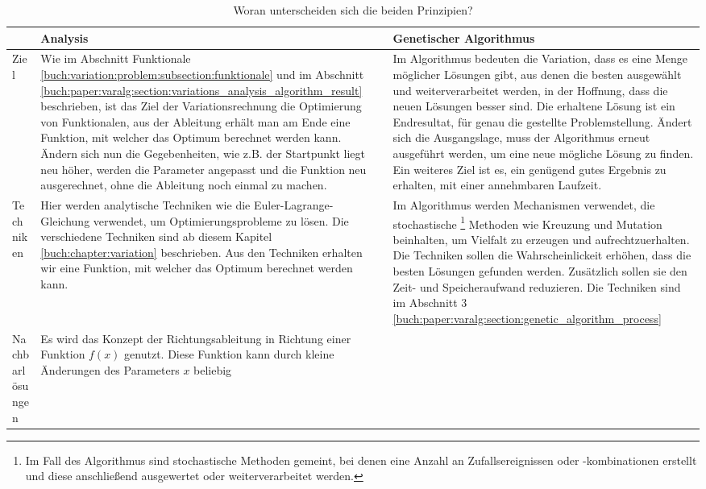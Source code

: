 \begin{xltabular}{\textwidth}{|L|X|X|}\centering
   \caption{Woran unterscheiden sich die beiden Prinzipien?}
   \hline
   & Analysis 
   & Genetischer Algorithmus 
   \\ \hline
   Ziel
   & 
   Wie im Abschnitt Funktionale \ref{buch:variation:problem:subsection:funktionale} und 
   im Abschnitt \ref{buch:paper:varalg:section:variations_analysis_algorithm_result}
   beschrieben, ist das Ziel der Variationsrechnung die Optimierung von Funktionalen, aus der 
   Ableitung erhält man am Ende eine Funktion, mit welcher das Optimum berechnet werden kann.  
   Ändern sich nun die Gegebenheiten, wie z.B. der Startpunkt liegt neu höher, werden die Parameter  
   angepasst und die Funktion neu ausgerechnet, ohne die Ableitung noch einmal zu machen. 
   & 
   Im Algorithmus bedeuten die Variation, dass es eine Menge möglicher Lösungen gibt, 
   aus denen die besten ausgewählt und weiterverarbeitet werden, in der 
   Hoffnung, dass die neuen Lösungen besser sind. Die erhaltene Lösung ist ein Endresultat, für
   genau die gestellte Problemstellung. Ändert sich die Ausgangslage, muss der Algorithmus
   erneut ausgeführt werden, um eine neue mögliche Lösung zu finden. Ein weiteres Ziel ist es,
   ein genügend gutes Ergebnis zu erhalten, mit einer annehmbaren Laufzeit.
   \\ \hline
   Techniken  
   & Hier werden analytische Techniken wie die Euler-Lagrange-Gleichung verwendet, 
   um Optimierungsprobleme zu lösen. Die verschiedene Techniken sind ab diesem Kapitel
   \ref{buch:chapter:variation} beschrieben. Aus den Techniken erhalten wir eine Funktion,
   mit welcher das Optimum berechnet werden kann.
   & Im Algorithmus werden Mechanismen verwendet, die stochastische
   \footnote{
      Im Fall des Algorithmus sind stochastische Methoden gemeint, bei denen 
      eine Anzahl an Zufallsereignissen oder -kombinationen erstellt und 
      diese anschließend ausgewertet oder weiterverarbeitet werden.
   }
   Methoden wie Kreuzung und Mutation beinhalten, um Vielfalt zu erzeugen und aufrechtzuerhalten.
   Die Techniken sollen die Wahrscheinlickeit erhöhen, dass die besten Lösungen gefunden werden.
   Zusätzlich sollen sie den Zeit- und Speicheraufwand reduzieren.
   Die Techniken sind im Abschnitt 3 \ref{buch:paper:varalg:section:genetic_algorithm_process}
   \\ \hline
   Nachbarlösungen
   & Es wird das Konzept der Richtungsableitung in Richtung einer Funktion \(f(x)\)
   genutzt. Diese Funktion kann durch kleine Änderungen des Parameters \(x\) beliebig

\end{xltabular}
